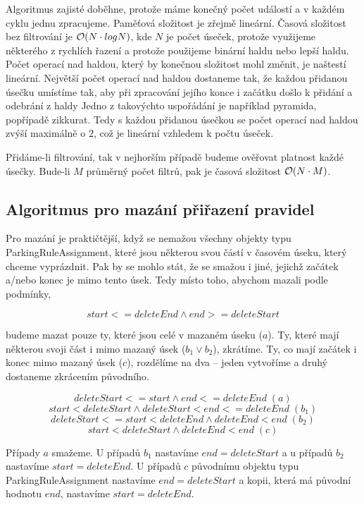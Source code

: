 \noindent
Algoritmus zajisté doběhne, protože máme konečný počet událostí a v každém cyklu jednu zpracujeme.
Paměťová složitost je zřejmě lineární. Časová složitost bez filtrování je ${\cal O}(N\cdot{logN})$, kde $N$ je 
počet úseček, protože
využijeme některého z rychlích řazení a protože použijeme binární haldu nebo lepší haldu. Počet operací nad haldou,
který by konečnou složitost mohl změnit, je naštestí lineární. Největší počet operací nad haldou dostaneme tak, že
každou přidanou úsečku umístíme tak, aby při zpracování jejího konce i začátku došlo k přidání a odebrání z haldy
Jedno z takovýchto uspořádání je například pyramida, popřípadě zikkurat.
Tedy s každou přidanou úsečkou se počet operací nad haldou zvýší maximálně o $2$, což je lineární vzhledem k počtu úseček.

Přidáme-li filtrování, tak v nejhorším případě budeme ověřovat platnost každé úsečky. Bude-li $M$ průměrný počet
filtrů, pak je časová složitost ${\cal O}(N\cdot{M})$. 

\subsection{Algoritmus pro mazání přiřazení pravidel}

\noindent
Pro mazání je praktičtější, když se nemažou všechny objekty typu ParkingRuleAssignment, které jsou
některou svou částí v
časovém úseku, který chceme vyprázdnit. Pak by se mohlo stát, že se smažou i jiné, jejichž
začátek a/nebo konec je mimo tento úsek. Tedy místo toho, abychom mazali podle podmínky,

$${start} <= {deleteEnd} \land {end} >= {deleteStart}$$

\noindent
budeme mazat pouze ty, které jsou celé v mazaném úseku ($a$).
Ty, které mají některou svoji část i mimo mazaný úsek ($b_1 \lor b_2$), zkrátíme. Ty, co
mají začátek i konec mimo mazaný úsek ($c$), rozdělíme na dva -- jeden vytvoříme a druhý
dostaneme zkrácením původního.

$${deleteStart} <= {start} \land {end} <= {deleteEnd}\;(a)$$
$${start} < {deleteStart} \land {deleteStart} < {end} <= {deleteEnd}\;(b_1)$$
$${deleteStart} <= {start} < {deleteEnd} \land {deleteEnd} < {end}\;(b_2)$$
$${start} < {deleteStart} \land {deleteEnd} < {end}\;(c)$$

\noindent
Případy $a$ smažeme.
U případů $b_1$ nastavíme $end = deleteStart$ a u případů $b_2$ nastavíme $start = deleteEnd$.
U případů $c$ původnímu objektu typu ParkingRuleAssignment nastavíme $end = deleteStart$ a kopii,
která má původní hodnotu $end$, nastavíme $start = deleteEnd$.


